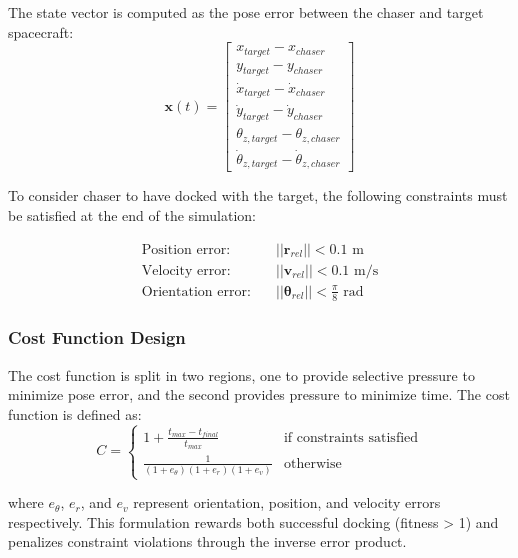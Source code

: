 The state vector is computed as the pose error between the chaser and target spacecraft:
\begin{equation}
    \mathbf{x}(t) = \begin{bmatrix}
        x_{target} - x_{chaser}               \\
        y_{target} - y_{chaser}               \\
        \dot{x}_{target} - \dot{x}_{chaser}   \\
        \dot{y}_{target} - \dot{y}_{chaser}   \\
        \theta_{z,target} - \theta_{z,chaser} \\
        \dot{\theta}_{z,target} - \dot{\theta}_{z,chaser}
    \end{bmatrix}
\end{equation}

To consider chaser to have docked with the target, the following constraints
must be satisfied at the end of the simulation:

\begin{align}
    \text{Position error:} \quad    & ||\mathbf{r}_{rel}|| < 0.1 \text{ m}                      \\
    \text{Velocity error:} \quad    & ||\mathbf{v}_{rel}|| < 0.1 \text{ m/s}                    \\
    \text{Orientation error:} \quad & ||\boldsymbol{\theta}_{rel}|| < \frac{\pi}{8} \text{ rad}
\end{align}

\subsubsection{Cost Function Design}
The cost function is split in two regions, one to provide selective pressure to
minimize pose error, and the second provides pressure
to minimize time. The cost function is defined as:
\begin{equation}
    C = \begin{cases}
        1 + \frac{t_{max} - t_{final}}{t_{max}}      & \text{if constraints satisfied} \\
        \frac{1}{(1 + e_{\theta})(1 + e_r)(1 + e_v)} & \text{otherwise}
    \end{cases}
\end{equation}

where $e_{\theta}$, $e_r$, and $e_v$ represent orientation, position, and
velocity errors respectively. This formulation rewards both successful docking
(fitness > 1) and penalizes constraint violations through the inverse error
product.

